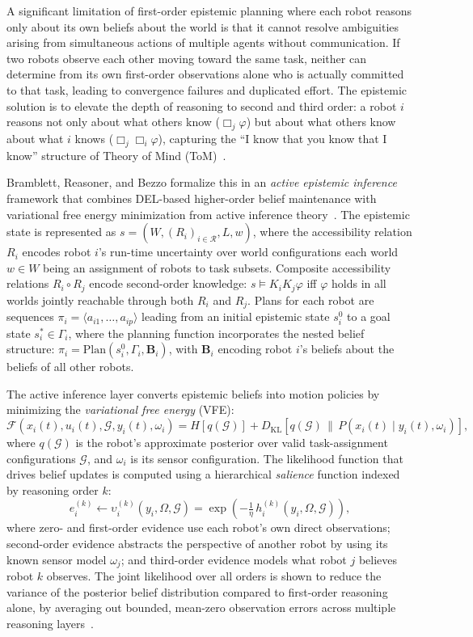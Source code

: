 \documentclass[12pt,a4paper]{article}
\theoremstyle{definition}
\theoremstyle{plain}
\begin{document}
A significant limitation of first-order epistemic planning where each robot reasons
only about its own beliefs about the world is that it cannot resolve ambiguities
arising from simultaneous actions of multiple agents without communication. If two
robots observe each other moving toward the same task, neither can determine from
its own first-order observations alone who is actually committed to that task, leading
to convergence failures and duplicated effort. The epistemic solution is to elevate
the depth of reasoning to second and third order: a robot $i$ reasons not only about
what others know ($\Box_j \varphi$) but about what others know about what $i$ knows
($\Box_j \Box_i \varphi$), capturing the ``I know that you know that I know''
structure of Theory of Mind (ToM)~\cite{bramblett2025active}.

Bramblett, Reasoner, and Bezzo formalize this in an \textit{active epistemic inference}
framework that combines DEL-based higher-order belief maintenance with variational
free energy minimization from active inference theory~\cite{bramblett2025active}. The
epistemic state is represented as $s = (W, (R_i)_{i \in \mathcal{R}}, L, w)$, where
the accessibility relation $R_i$ encodes robot $i$'s run-time uncertainty over world
configurations each world $w \in W$ being an assignment of robots to task subsets.
Composite accessibility relations $R_i \circ R_j$ encode second-order knowledge:
$s \models K_i K_j \varphi$ iff $\varphi$ holds in all worlds jointly reachable through
both $R_i$ and $R_j$. Plans for each robot are sequences $\pi_i = \langle a_{i1}, \ldots,
a_{ip}\rangle$ leading from an initial epistemic state $s^0_i$ to a goal state
$s^*_i \in \Gamma_i$, where the planning function incorporates the nested belief structure:
$\pi_i = \mathrm{Plan}(s^0_i, \Gamma_i, \mathbf{B}_i)$, with $\mathbf{B}_i$ encoding
robot $i$'s beliefs about the beliefs of all other robots.

The active inference layer converts epistemic beliefs into motion policies by
minimizing the \textit{variational free energy} (VFE):
\[
\mathcal{F}(x_i(t), u_i(t), \mathcal{G}, y_i(t), \omega_i) =
H[q(\mathcal{G})] + D_{\mathrm{KL}}[q(\mathcal{G}) \,\|\,
P(x_i(t) \mid y_i(t), \omega_i)],
\]
where $q(\mathcal{G})$ is the robot's approximate posterior over valid task-assignment
configurations $\mathcal{G}$, and $\omega_i$ is its sensor configuration. The likelihood
function that drives belief updates is computed using a hierarchical \textit{salience}
function indexed by reasoning order $k$:
\[
e^{(k)}_i \leftarrow \upsilon^{(k)}_i(y_i, \Omega, \mathcal{G}) =
\exp\!\left(-\tfrac{1}{\eta}\, h^{(k)}_i(y_i, \Omega, \mathcal{G})\right),
\]
where zero- and first-order evidence use each robot's own direct observations; second-order
evidence abstracts the perspective of another robot by using its known sensor model $\omega_j$;
and third-order evidence models what robot $j$ believes robot $k$ observes. The joint
likelihood over all orders is shown to reduce the variance of the posterior belief distribution
compared to first-order reasoning alone, by averaging out bounded, mean-zero observation errors
across multiple reasoning layers~\cite{bramblett2025active}.
\end{document}
